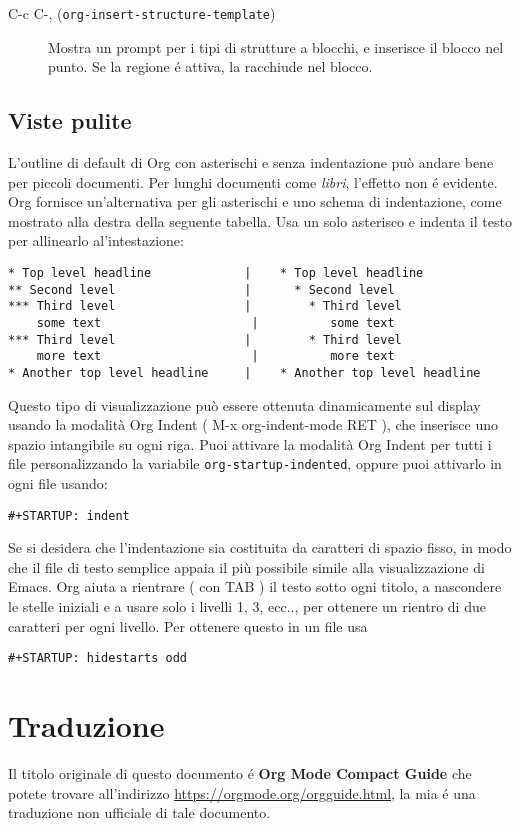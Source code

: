 \documentclass[11pt]{article}
\begin{document}
\begin{description}
\item[{C-c C-, (\texttt{org-insert-structure-template})}] Mostra un prompt per i tipi di strutture a blocchi, e inserisce il
blocco nel punto. Se la regione é attiva, la racchiude nel blocco.
\end{description}

\subsection*{Viste pulite}
\label{sec:orge7a72b1}
L'outline di default di Org con asterischi e senza indentazione può
andare bene per piccoli documenti. Per lunghi documenti come \emph{libri},
l'effetto non é evidente. Org fornisce un'alternativa per gli
asterischi e uno schema di indentazione, come mostrato alla destra
della seguente tabella. Usa un solo asterisco e indenta il testo per
allinearlo al'intestazione:

\begin{verbatim}
* Top level headline             |    * Top level headline
** Second level                  |      * Second level
*** Third level                  |        * Third level
    some text                     |          some text
*** Third level                  |        * Third level
    more text                     |          more text
* Another top level headline     |    * Another top level headline
\end{verbatim}

Questo tipo di visualizzazione può essere ottenuta dinamicamente sul
display usando la modalità Org Indent ( M-x org-indent-mode RET ), che inserisce uno spazio intangibile su ogni riga. Puoi
attivare la modalità Org Indent per tutti i file personalizzando la
variabile \texttt{org-startup-indented}, oppure puoi attivarlo in ogni file
usando:

\begin{verbatim}
#+STARTUP: indent
\end{verbatim}


Se si desidera che l'indentazione sia costituita da caratteri di
spazio fisso, in modo che il file di testo semplice appaia il più
possibile simile alla visualizzazione di Emacs. Org aiuta a rientrare
( con TAB ) il testo sotto ogni titolo, a nascondere le
stelle iniziali e a usare solo i livelli 1, 3, ecc.., per ottenere un
rientro di due caratteri per ogni livello. Per ottenere questo in un
file usa

\begin{verbatim}
#+STARTUP: hidestarts odd
\end{verbatim}

\section{Traduzione}
\label{sec:orgd57a2c3}
Il titolo originale di questo documento é \textbf{Org Mode Compact Guide} che potete
trovare all'indirizzo \url{https://orgmode.org/orgguide.html}, la mia é una
traduzione non ufficiale di tale documento.
\end{document}
